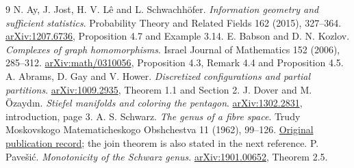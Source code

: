 \documentclass[11pt]{article}
\theoremstyle{definition}
\begin{document}
\begin{thebibliography}{9}
 N. Ay, J. Jost, H. V. L\^e and L. Schwachh\"ofer. \emph{Information geometry and sufficient statistics}. Probability Theory and Related Fields 162 (2015), 327--364. \href{https://arxiv.org/pdf/1207.6736}{arXiv:1207.6736}, Proposition 4.7 and Example 3.14.
 E. Babson and D. N. Kozlov. \emph{Complexes of graph homomorphisms}. Israel Journal of Mathematics 152 (2006), 285--312. \href{https://arxiv.org/pdf/math/0310056}{arXiv:math/0310056}, Proposition 4.3, Remark 4.4 and Proposition 4.5.
 A. Abrams, D. Gay and V. Hower. \emph{Discretized configurations and partial partitions}. \href{https://arxiv.org/pdf/1009.2935}{arXiv:1009.2935}, Theorem 1.1 and Section 2.
 J. Dover and M. \"Ozayd\i n. \emph{Stiefel manifolds and coloring the pentagon}. \href{https://arxiv.org/pdf/1302.2831}{arXiv:1302.2831}, introduction, page 3.
 A. S. Schwarz. \emph{The genus of a fibre space}. Trudy Moskovskogo Matematicheskogo Obshchestva 11 (1962), 99--126. \href{https://www.mathnet.ru/eng/mmo132}{Original publication record}; the join theorem is also stated in the next reference.
 P. Pave\v{s}i\'c. \emph{Monotonicity of the Schwarz genus}. \href{https://arxiv.org/pdf/1901.00652}{arXiv:1901.00652}, Theorem 2.5.
\end{thebibliography}
\end{document}
